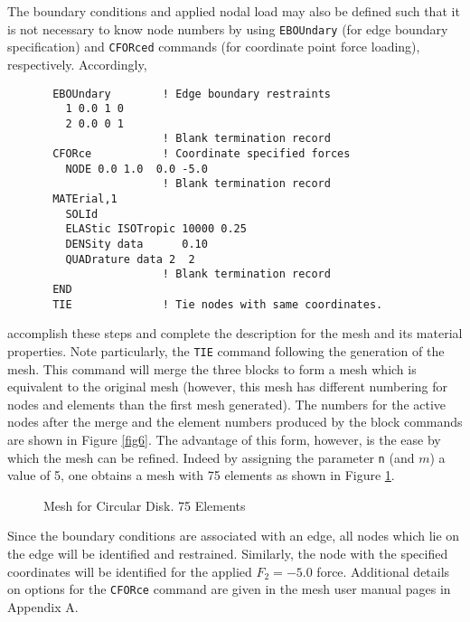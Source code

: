 The boundary conditions and applied nodal load may also be defined such that
it is not necessary to know node numbers by using {\tt EBOUndary} (for
edge boundary specification) and {\tt CFORced} commands
(for coordinate point force loading), respectively.  Accordingly,
\begin{verbatim}
       EBOUndary        ! Edge boundary restraints
         1 0.0 1 0
         2 0.0 0 1
                        ! Blank termination record
       CFORce           ! Coordinate specified forces
         NODE 0.0 1.0  0.0 -5.0
                        ! Blank termination record
       MATErial,1
         SOLId
         ELAStic ISOTropic 10000 0.25
         DENSity data      0.10
         QUADrature data 2  2
                        ! Blank termination record
       END
       TIE              ! Tie nodes with same coordinates.
\end{verbatim}
accomplish these steps and complete the description for the mesh
and its material properties.
Note particularly, the {\tt TIE} command following the generation of
the mesh.  This command will merge the three blocks to form a
mesh which is equivalent to the original mesh (however, this mesh has
different numbering for nodes and elements than the first mesh generated).
The numbers for the active nodes after the merge and the element numbers
produced by the block commands are shown in Figure \ref{fig6}.
The advantage of this form, however, is the ease by which the mesh
can be refined.  Indeed by assigning the parameter {\tt n} (and $m$) a value
of 5, one obtains a mesh with 75 elements as shown in Figure \ref{fig7}.

\begin{figure}[ht!]
\epsfxsize=2.8in
\centerline {\hfil {} \hfil}
\caption{Mesh for Circular Disk. 75 Elements}
\label{fig7}
\end{figure}

Since the boundary conditions are associated with an edge, all nodes
which lie on the edge will be identified and restrained.  Similarly,
the node with the specified coordinates will be identified for the
applied $F_2 = -5.0$ force.
Additional details on options for the {\tt CFORce} command are given in the
mesh user manual pages in Appendix A.

